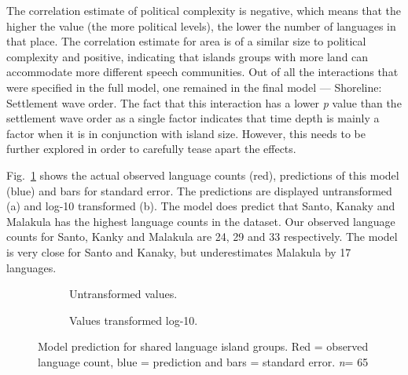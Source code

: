 \documentclass[a4paper,10pt]{article} %
\begin{document}
The correlation estimate of political complexity is negative, which means that the higher the value (the more political levels), the lower the number of languages in that place. The correlation estimate for area is of a similar size to political complexity and positive, indicating that islands groups with more land can accommodate more different speech communities. Out of all the interactions that were specified in the full model, one remained in the final model --- Shoreline: Settlement wave order. The fact that this interaction has a lower \emph{p} value than the settlement wave order as a single factor indicates that time depth is mainly a factor when it is in conjunction with island size. However, this needs to be further explored in order to carefully tease apart the effects.

Fig.~\ref{medium_model_predict} shows the actual observed language counts (red), predictions of this model (blue) and bars for standard error. The predictions are displayed untransformed (a) and log-10 transformed (b). The model does predict that Santo, Kanaky and Malakula has the highest language counts in the dataset. Our observed language counts for Santo, Kanky and Malakula are 24, 29 and 33 respectively. The model is very close for Santo and Kanaky, but underestimates Malakula by 17 languages.

    \begin{figure}
\centering
    \begin{subfigure}{12cm}
\centering
\caption{Untransformed values.}
    \end{subfigure}
\hfil
    \begin{subfigure}{12cm}
\centering
\caption{Values transformed log-10.}
    \end{subfigure}
    \caption[Model prediction for shared language island group.]{{Model prediction for shared language island groups. Red = observed language count, blue = prediction and bars = standard error.  \emph{n}= 65}}
\label{medium_model_predict}
\end{figure}

\end{document}
